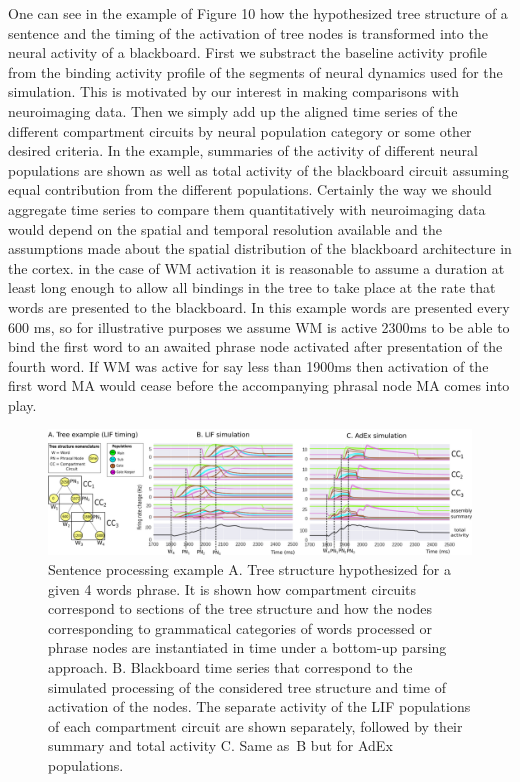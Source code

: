 \documentclass[10pt]{article}
\begin{document}
One can see in the example of Figure 10 how the hypothesized tree
structure of a sentence and the timing of the activation of tree nodes
is transformed into the neural activity of a blackboard. First we
substract the baseline activity profile from the binding activity
profile of the segments of neural dynamics used for the simulation. This
is motivated by our interest in making comparisons with neuroimaging
data. Then we simply add up the aligned time series of the different
compartment circuits by neural population category or some other desired
criteria. In the example, summaries of the activity of different neural
populations are shown as well as total activity of the blackboard
circuit assuming equal contribution from the different populations.
Certainly the way we should aggregate time series to compare them
quantitatively with neuroimaging data would depend on the spatial and
temporal resolution available and the assumptions made about the spatial
distribution of the blackboard architecture in the cortex. in the case
of WM activation it is reasonable to assume a duration at least long
enough to allow all bindings in the tree to take place at the rate that
words are presented to the blackboard. In this example words are
presented every 600 ms, so for illustrative purposes we assume WM is
active 2300ms to be able to bind the first word to an awaited phrase
node activated after presentation of the fourth word. If WM was active
for say less than 1900ms then activation of the first word MA would
cease before the accompanying phrasal node MA comes into play.

\begin{figure}[h!]
\begin{center}
\includegraphics[width=1.00\columnwidth]{figures/compartments_tree_example/compartments_tree_example}
\caption{{Sentence processing example
{\label{679921}}
A. Tree structure hypothesized for a given 4 words phrase. It is shown
how compartment circuits correspond to sections of the tree structure
and how the nodes corresponding to grammatical categories of words
processed or phrase nodes are instantiated in time under a bottom-up
parsing approach. B. Blackboard time series that correspond to the
simulated processing of the considered tree structure and time of
activation of the nodes. The separate activity of the LIF populations of
each compartment circuit are shown separately, followed by their summary
and total activity C. Same as~B but for AdEx populations.
{\label{679921}}%
}}
\end{center}
\end{figure}
\end{document}
